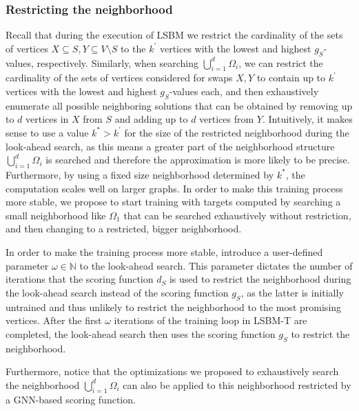 \documentclass[draft,final]{vutinfth} %
\begin{document}
\subsubsection{Restricting the neighborhood}

Recall that during the execution of LSBM we restrict the cardinality of the sets of vertices $X \subseteq S, Y \subseteq V \setminus S$ to the $k^\prime$ vertices with the lowest and highest $g_S$-values, respectively. Similarly, when searching $\bigcup_{i=1}^d \Omega_i$, we can restrict the cardinality of the sets of vertices considered for swaps $X, Y$ to contain up to $k^\prime$ vertices with the lowest and highest $g_S$-values each, and then exhaustively enumerate all possible neighboring solutions that can be obtained by removing up to $d$ vertices in $X$ from $S$ and adding up to $d$ vertices from $Y$. Intuitively, it makes sense to use a value $k^* > k^\prime$ for the size of the restricted neighborhood during the look-ahead search, as this means a greater part of the neighborhood structure $\bigcup_{i=1}^d \Omega_i$ is searched and therefore the approximation is more likely to be precise. 
Furthermore, by using a fixed size neighborhood determined by $k^*$, the computation scales well on larger graphs. 
In order to make this training process more stable, we propose to start training with targets computed by searching a small neighborhood like $\Omega_1$ that can be searched exhaustively without restriction, and then changing to a restricted, bigger neighborhood. 

In order to make the training process more stable, introduce a user-defined parameter $\omega \in \mathbb{N}$ to the look-ahead search. This parameter dictates the number of iterations that the scoring function $d_S$ is used to restrict the neighborhood during the look-ahead search instead of the scoring function $g_S$, as the latter is initially untrained and thus unlikely to restrict the neighborhood to the most promising vertices. After the first $\omega$ iterations of the training loop in LSBM-T are completed, the look-ahead search then uses the scoring function $g_S$ to restrict the neighborhood. 

Furthermore, notice that the optimizations we proposed to exhaustively search the neighborhood $\bigcup_{i=1}^d \Omega_i$ can also be applied to this neighborhood restricted by a GNN-based scoring function. 

\end{document}
